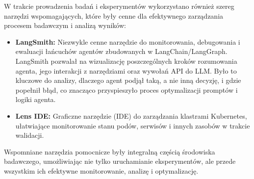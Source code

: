 W trakcie prowadzenia badań i eksperymentów wykorzystano również szereg narzędzi wspomagających, które były cenne dla efektywnego zarządzania procesem badawczym i analizą wyników:
\begin{itemize}
	\item \textbf{LangSmith:} Niezwykle cenne narzędzie do monitorowania, debugowania i ewaluacji łańcuchów agentów zbudowanych w LangChain/LangGraph. LangSmith pozwalał na wizualizację poszczególnych kroków rozumowania agenta, jego interakcji z narzędziami oraz wywołań API do LLM. Było to kluczowe do analizy, dlaczego agent podjął taką, a nie inną decyzję, i gdzie popełnił błąd, co znacząco przyspieszyło proces optymalizacji promptów i logiki agenta.
	\item \textbf{Lens IDE:} Graficzne narzędzie (IDE) do zarządzania klastrami Kubernetes, ułatwiające monitorowanie stanu podów, serwisów i innych zasobów w trakcie walidacji.
\end{itemize}
Wspomniane narzędzia pomocnicze były integralną częścią środowiska badawczego, umożliwiając nie tylko uruchamianie eksperymentów, ale przede wszystkim ich efektywne monitorowanie, analizę i optymalizację.
